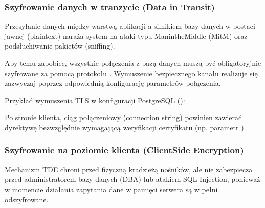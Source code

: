 \documentclass[letterpaper,10pt,polish]{sphinxmanual}
\begin{document}
\subsubsection{Szyfrowanie danych w tranzycie (Data in Transit)}
\label{\detokenize{rozdzia_u0142_2/rozdzia_u0142_27/rozdzial_4:szyfrowanie-danych-w-tranzycie-data-in-transit}}
\sphinxAtStartPar
Przesyłanie danych między warstwą aplikacji a silnikiem bazy danych w postaci jawnej (plaintext) naraża system na ataki typu Man\sphinxhyphen{}in\sphinxhyphen{}the\sphinxhyphen{}Middle (MitM) oraz podsłuchiwanie pakietów (sniffing).

\sphinxAtStartPar
Aby temu zapobiec, wszystkie połączenia z bazą danych muszą być obligatoryjnie szyfrowane za pomocą protokołu . Wymuszenie bezpiecznego kanału realizuje się zazwyczaj poprzez odpowiednią konfigurację parametrów połączenia.

\sphinxAtStartPar
Przykład wymuszenia TLS w konfiguracji PostgreSQL ():

\begin{sphinxVerbatim}[commandchars=\\\{\}]
\end{sphinxVerbatim}

\sphinxAtStartPar
Po stronie klienta, ciąg połączeniowy (connection string) powinien zawierać dyrektywę bezwzględnie wymagającą weryfikacji certyfikatu (np. parametr ).


\subsubsection{Szyfrowanie na poziomie klienta (Client\sphinxhyphen{}Side Encryption)}
\label{\detokenize{rozdzia_u0142_2/rozdzia_u0142_27/rozdzial_4:szyfrowanie-na-poziomie-klienta-client-side-encryption}}
\sphinxAtStartPar
Mechanizm TDE chroni przed fizyczną kradzieżą nośników, ale nie zabezpiecza przed administratorem bazy danych (DBA) lub atakiem SQL Injection, ponieważ w momencie działania zapytania dane w pamięci serwera są w pełni odszyfrowane.
\end{document}

